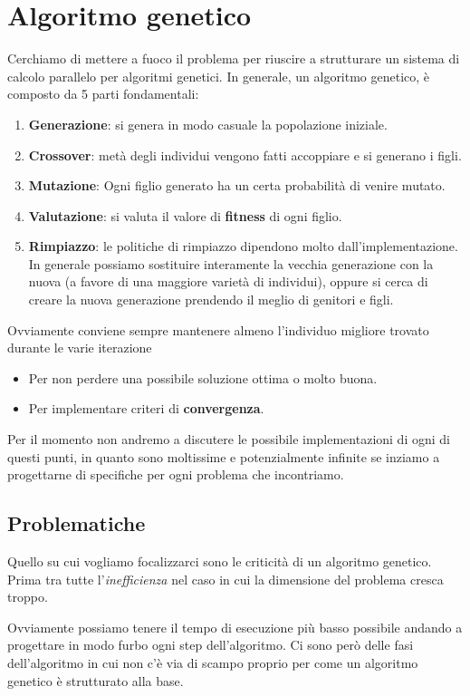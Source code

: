 \section{Algoritmo genetico}

Cerchiamo di mettere a fuoco il problema per riuscire a strutturare un sistema
di calcolo parallelo per algoritmi genetici. In generale, un algoritmo genetico,
è composto da 5 parti fondamentali:
\begin{enumerate}
	\item \textbf{Generazione}: si genera in modo casuale la popolazione
	      iniziale.
	\item \textbf{Crossover}: metà degli individui vengono fatti accoppiare e
	      si generano i figli.
	\item \textbf{Mutazione}: Ogni figlio generato ha un certa probabilità di
	      venire mutato.
	\item \textbf{Valutazione}: si valuta il valore di \textbf{fitness} di ogni
	      figlio.
	\item \textbf{Rimpiazzo}: le politiche di rimpiazzo dipendono molto
	      dall'implementazione. In generale possiamo sostituire interamente la
	      vecchia generazione con la nuova (a favore di una maggiore varietà di
	      individui), oppure si cerca di creare la nuova generazione prendendo
	      il meglio di genitori e figli.
\end{enumerate}
Ovviamente conviene sempre mantenere almeno l'individuo migliore trovato
durante le varie iterazione
\begin{itemize}
	\item Per non perdere una possibile soluzione ottima o molto buona.
	\item Per implementare criteri di \textbf{convergenza}.
\end{itemize}
Per il momento non andremo a discutere le possibile implementazioni di ogni di
questi punti, in quanto sono moltissime e potenzialmente infinite se inziamo a
progettarne di specifiche per ogni problema che incontriamo.

\subsection{Problematiche}

Quello su cui vogliamo focalizzarci sono le criticità di un algoritmo genetico.
Prima tra tutte l'\emph{inefficienza} nel caso in cui la dimensione del
problema cresca troppo.

Ovviamente possiamo tenere il tempo di esecuzione più basso possibile andando
a progettare in modo furbo ogni step dell'algoritmo. Ci sono però delle fasi
dell'algoritmo in cui non c'è via di scampo proprio per come un algoritmo
genetico è strutturato alla base.

